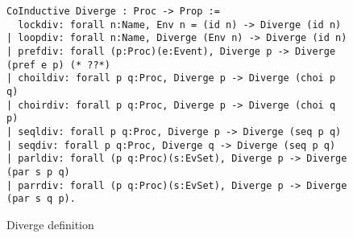 \documentclass{comjnl}
\begin{document}
\begin{figure*}
\caption{\label{fig:my-label} Diverge definition}
\begin{verbatim}
CoInductive Diverge : Proc -> Prop :=
  lockdiv: forall n:Name, Env n = (id n) -> Diverge (id n)
| loopdiv: forall n:Name, Diverge (Env n) -> Diverge (id n)
| prefdiv: forall (p:Proc)(e:Event), Diverge p -> Diverge (pref e p) (* ??*)
| choildiv: forall p q:Proc, Diverge p -> Diverge (choi p q)
| choirdiv: forall p q:Proc, Diverge p -> Diverge (choi q p)
| seqldiv: forall p q:Proc, Diverge p -> Diverge (seq p q)
| seqdiv: forall p q:Proc, Diverge q -> Diverge (seq p q)
| parldiv: forall (p q:Proc)(s:EvSet), Diverge p -> Diverge (par s p q)
| parrdiv: forall (p q:Proc)(s:EvSet), Diverge p -> Diverge (par s q p).
\end{verbatim}
\end{figure*}






\end{document}
